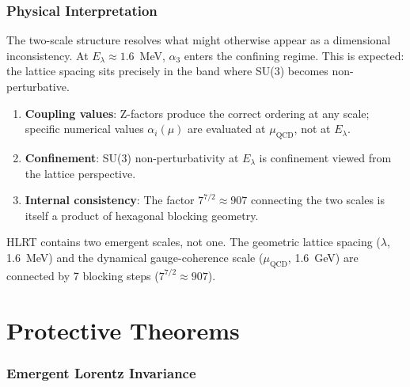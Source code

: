 \documentclass[11pt,letterpaper]{article}
\begin{document}
\section{Physical Interpretation}

The two-scale structure resolves what might otherwise appear as a
dimensional inconsistency.  At $E_\lambda\approx1.6$~MeV, $\alpha_3$
enters the confining regime.  This is expected: the lattice spacing sits
precisely in the band where SU(3) becomes non-perturbative.

\begin{enumerate}[label=(\arabic*),nosep]
  \item \textbf{Coupling values}: Z-factors produce the correct ordering at
        any scale; specific numerical values $\alpha_i(\mu)$ are evaluated
        at $\mu_\mathrm{QCD}$, not at $E_\lambda$.
  \item \textbf{Confinement}: SU(3) non-perturbativity at $E_\lambda$ is
        confinement viewed from the lattice perspective.
  \item \textbf{Internal consistency}: The factor $7^{7/2}\approx907$
        connecting the two scales is itself a product of hexagonal blocking
        geometry.
\end{enumerate}

\begin{tcolorbox}[colback=hlrtred!5!white,colframe=hlrtred,title=Structural Spine]
HLRT contains two emergent scales, not one.  The geometric lattice spacing
($\lambda$, 1.6~MeV) and the dynamical gauge-coherence scale
($\mu_\mathrm{QCD}$, 1.6~GeV) are connected by 7 blocking steps
($7^{7/2}\approx907$).
\end{tcolorbox}

%
%
\newpage
\part{Protective Theorems}

\section{Emergent Lorentz Invariance}\label{sec:lorentz}
\end{document}
